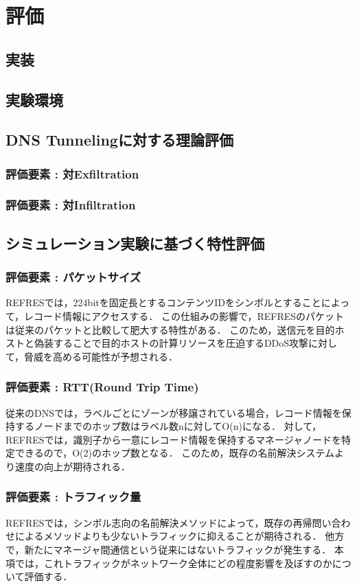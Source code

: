 \section{評価}
\subsection{実装}
\subsection{実験環境}
\subsection{DNS Tunnelingに対する理論評価}
\subsubsection{評価要素 : 対Exfiltration}
\subsubsection{評価要素 : 対Infiltration}
\subsection{シミュレーション実験に基づく特性評価}
\subsubsection{評価要素 : パケットサイズ}
REFRESでは，224bitを固定長とするコンテンツIDをシンボルとすることによって，レコード情報にアクセスする．
この仕組みの影響で，REFRESのパケットは従来のパケットと比較して肥大する特性がある．
このため，送信元を目的ホストと偽装することで目的ホストの計算リソースを圧迫するDDoS攻撃に対して，脅威を高める可能性が予想される．
\subsubsection{評価要素 : RTT(Round Trip Time)}
従来のDNSでは，ラベルごとにゾーンが移譲されている場合，レコード情報を保持するノードまでのホップ数はラベル数nに対してO(n)になる．
対して，REFRESでは，識別子から一意にレコード情報を保持するマネージャノードを特定できるので，O(2)のホップ数となる．
このため，既存の名前解決システムより速度の向上が期待される．
\subsubsection{評価要素 : トラフィック量}
REFRESでは，シンボル志向の名前解決メソッドによって，既存の再帰問い合わせによるメソッドよりも少ないトラフィックに抑えることが期待される．
他方で，新たにマネージャ間通信という従来にはないトラフィックが発生する．
本項では，これトラフィックがネットワーク全体にどの程度影響を及ぼすのかについて評価する．
